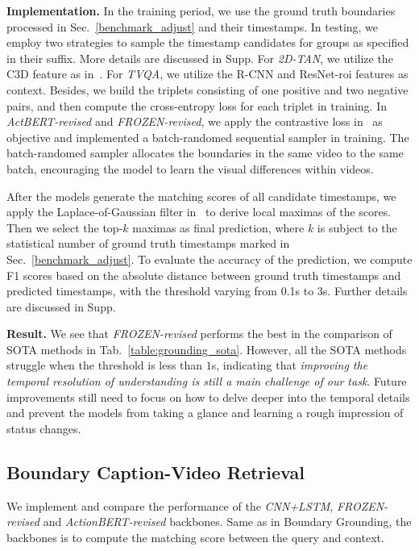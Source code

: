 \documentclass[runningheads]{llncs}
\begin{document}
\textbf{Implementation.} 
In the training period, we use the ground truth boundaries processed in Sec.~\ref{benchmark_adjust} and their timestamps. In testing, we employ two strategies to sample the timestamp candidates for groups as specified in their suffix. More details are discussed in Supp.
For \textit{2D-TAN}, we utilize the C3D feature as in~\cite{2DTAN_2020_AAAI}. For \textit{TVQA}, we utilize the R-CNN and ResNet-roi features as context. Besides, we build the triplets consisting of one positive and two negative pairs, and then compute the cross-entropy loss for each triplet in training. In \textit{ActBERT-revised} and \textit{FROZEN-revised}, we apply the contrastive loss in~\cite{bain2021frozen} as objective and implemented a batch-randomed sequential sampler in training. The batch-randomed sampler allocates the boundaries in the same video to the same batch, encouraging the model to learn the visual differences within videos.

After the models generate the matching scores of all candidate timestamps, we apply the Laplace-of-Gaussian filter in~\cite{shou2021generic} to derive local maximas of the scores. Then we select the top-$k$ maximas as final prediction, where $k$ is subject to the statistical number of ground truth timestamps marked in Sec.~\ref{benchmark_adjust}. To evaluate the accuracy of the prediction, we compute F1 scores based on the absolute distance between ground truth timestamps and predicted timestamps, with the threshold varying from 0.1s to 3s. Further details are discussed in Supp.

\textbf{Result.}
We see that \textit{FROZEN-revised} performs the best in the comparison of SOTA methods in Tab.~\ref{table:grounding_sota}. However, all the SOTA methods struggle when the threshold is less than $1$s, indicating that \textit{improving the temporal resolution of understanding is still a main challenge of our task}. Future improvements still need to focus on how to delve deeper into the temporal details and prevent the models from taking a glance and learning a rough impression of status changes.

\subsection{Boundary Caption-Video Retrieval}
We implement and compare the performance of the \textit{CNN+LSTM}, \textit{FROZEN-revised} and \textit{ActionBERT-revised} backbones. Same as in Boundary Grounding, the backbones is to compute the matching score between the query and context.
\end{document}
